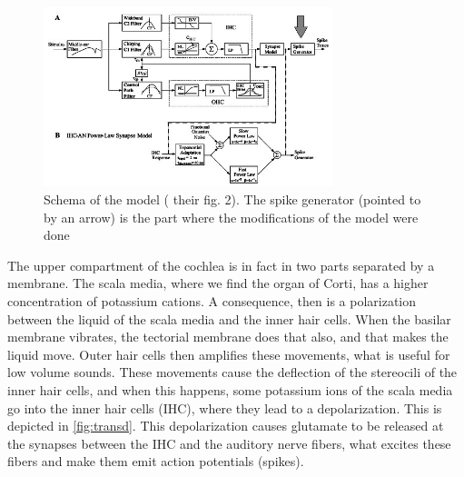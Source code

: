 \begin{figure}[ht]
	\centering
  \includegraphics[width=0.75\textwidth]{images/www-bme-rochester-edu-schematicDiagram-level.jpg}
	\caption{Schema of the model (\cite{Model1} their fig. 2). 
	The spike generator (pointed to by an arrow) is 
	the part where the modifications of the model were done}
	\label{fig:modelsch}
\end{figure}

The upper compartment of the cochlea is in fact in two parts separated by a membrane.
The scala media, where we find the organ of Corti, has a higher 
concentration of potassium cations. A consequence, then is a polarization between
the liquid of the scala media and the inner hair cells. 
When the basilar membrane vibrates, the tectorial membrane does 
that also, and that makes the liquid move.
Outer hair cells then amplifies these movements, what is useful for low volume sounds. 
These movements cause the deflection of the stereocili 
of the inner hair cells, and when this happens, some potassium ions of the 
scala media go into the inner hair cells (IHC), where they lead to a depolarization.
This is depicted in \autoref{fig:transd}.
This depolarization causes glutamate to be released at the synapses %
between the IHC and the auditory nerve fibers, what excites these fibers 
and make them emit action potentials (spikes).




